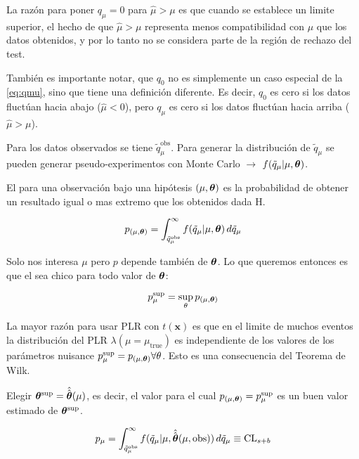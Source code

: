La razón para poner $q_\mu = 0$ para $\hat{\mu} > \mu$ es que cuando se establece
un limite superior, el hecho de que $\hat{\mu} > \mu$ representa menos
compatibilidad con $\mu$ que los datos obtenidos, y por lo tanto no se considera
parte de la región de rechazo del test.

También es importante notar, que $q_0$ no es simplemente un caso especial de la
\cref{eq:qmu}, sino que tiene una definición diferente. Es decir, $q_0$ es cero
si los datos fluctúan hacia abajo ($\hat{\mu}<0$), pero $q_\mu$ es cero si los
datos fluctúan hacia arriba ($\hat{\mu}>\mu$).

Para los datos observados se tiene $\tilde{q}_\mu^\text{obs}$. Para generar la
distribución de $\tilde{q}_\mu$ se pueden generar pseudo-experimentos con Monte Carlo
$\to$ $f(\tilde{q}_\mu|\mu, \bm{\theta})$.

El {\pvalue} para una observación bajo una hipótesis $(\mu,\bm{\theta})$ es la
probabilidad de obtener un resultado igual o mas extremo que los obtenidos dada
H.

\begin{equation}
  p_{(\mu,\bm{\theta})} = \int_{\tilde{q}_\mu^\text{obs}}^{\infty}
  f(\tilde{q}_\mu|\mu,\bm{\theta}) \, d\tilde{q}_\mu
\end{equation}

Solo nos interesa $\mu$ pero $p$ depende también de $\bm{\theta}$. Lo que queremos
entonces es que el {\pvalue} sea chico para todo valor de $\bm{\theta}$:

\begin{equation}
  p_\mu^\text{sup} = \sup_\theta p_{(\mu,\bm{\theta})}
\end{equation}

La mayor razón para usar PLR con $t(\bm{x})$ es que en el limite de muchos
eventos la distribución del PLR $\lambda(\mu=\mu_\text{true})$ es independiente
de los valores de los parámetros nuisance $p_\mu^\text{sup} = p_{(\mu,\bm{\theta})}
\forall \theta$. Esto es una consecuencia del Teorema de Wilk.

Elegir $\bm{\theta}^\text{sup} = \hat{\hat{\bm{\theta}}}(\mu)$, es decir, el valor para el
cual $p_{(\mu,\bm{\theta})} = p_\mu^\text{sup}$ es un buen valor estimado de
$\bm{\theta}^\text{sup}$.

\begin{equation}
  p_\mu = \int_{\tilde{q}_\mu^\text{obs}}^{\infty}
  f(\tilde{q}_\mu|\mu,\hat{\hat{\bm{\theta}}}(\mu, \text{obs})) \, d\tilde{q}_\mu \equiv
  \text{CL}_{s+b}
  \label{eq:pmu}
\end{equation}


